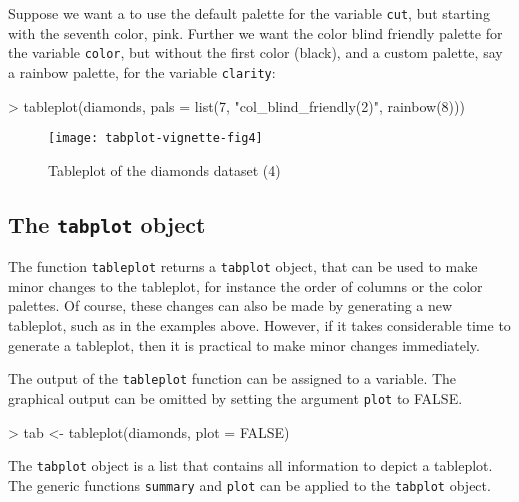 \documentclass[11pt, fleqn, a4paper]{article}
\begin{document}
Suppose we want a to use the default palette for the variable {\tt cut}, but starting with the seventh color, pink. Further we want the color blind friendly palette for the variable {\tt color}, but without the first color (black), and a custom palette, say a rainbow palette, for the variable {\tt clarity}:

\begin{Schunk}
\begin{Sinput}
> tableplot(diamonds, pals = list(7, "col_blind_friendly(2)", rainbow(8)))
\end{Sinput}
\end{Schunk}

\begin{figure}[htp]
\begin{center}
\texttt{[image: tabplot-vignette-fig4]}
\end{center}
\caption{Tableplot of the diamonds dataset (4)}
\label{fig:tp4}
\end{figure}

\subsection{The {\tt tabplot} object}

The function {\tt tableplot} returns a {\tt tabplot} object, that can be used to make minor changes to the tableplot, for instance the order of columns or the color palettes. Of course, these changes can also be made by generating a new tableplot, such as in the examples above. However, if it takes considerable time to generate a tableplot, then it is practical to make minor changes immediately.

The output of the {\tt tableplot} function can be assigned to a variable. The graphical output can be omitted by setting the argument {\tt plot} to FALSE.

\begin{Schunk}
\begin{Sinput}
> tab <- tableplot(diamonds, plot = FALSE)
\end{Sinput}
\end{Schunk}

The {\tt tabplot} object is a list that contains all information to depict a tableplot. The generic functions {\tt summary} and {\tt plot} can be applied to the {\tt tabplot} object.
\end{document}
